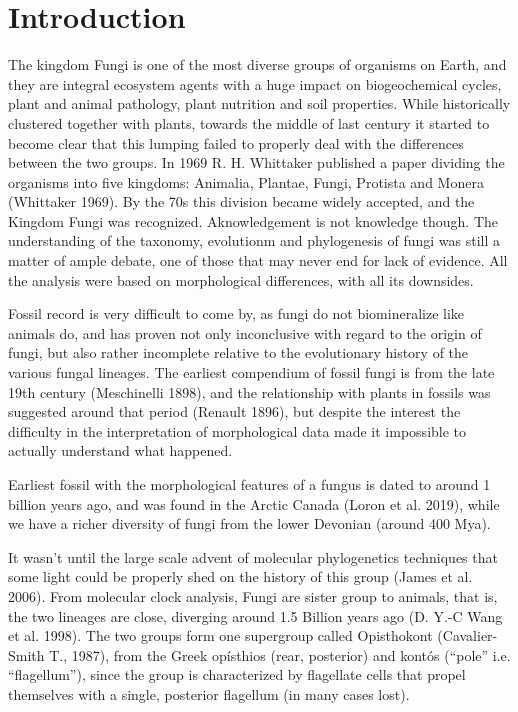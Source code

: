

\part{Introduction}
\label{introduction}

The kingdom Fungi is one of the most diverse groups of organisms on Earth, and they are integral ecosystem agents with a huge impact on biogeochemical cycles, plant and animal pathology, plant nutrition and soil properties.
While historically clustered together with plants, towards the middle of last century it started to become clear that this lumping failed to properly deal with the differences between the two groups. In 1969 R. H. Whittaker published a paper dividing the organisms into five kingdoms: Animalia, Plantae, Fungi, Protista and Monera (Whittaker 1969). By the 70s this division became widely accepted, and the Kingdom Fungi was recognized.
Aknowledgement is not knowledge though. The understanding of the taxonomy, evolutionm and phylogenesis of fungi was still a matter of ample debate, one of those that may never end for lack of evidence. All the analysis were based on morphological differences, with all its downsides.

Fossil record is very difficult to come by, as fungi do not biomineralize like animals do, and has proven not only inconclusive with regard to the origin of fungi, but also rather incomplete relative to the evolutionary history of the various fungal lineages. The earliest compendium of fossil fungi is from the late 19th century (Meschinelli 1898), and the relationship with plants in fossils was suggested around that period (Renault 1896), but despite the interest the difficulty in the interpretation of morphological data made it impossible to actually understand what happened.

Earliest fossil with the morphological features of a fungus is dated to around 1 billion years ago, and was found in the Arctic Canada (Loron et al. 2019), while we have a richer diversity of fungi from the lower Devonian (around 400 Mya).

It wasn't until the large scale advent of molecular phylogenetics techniques that some light could be properly shed on the history of this group (James et al. 2006).
From molecular clock analysis, Fungi are sister group to animals, that is, the two lineages are close, diverging around 1.5 Billion years ago (D. Y.-C Wang et al. 1998). The two groups form one supergroup called Opisthokont (Cavalier-Smith T., 1987), from the Greek opísthios (rear, posterior) and kontós (``pole'' i.e. ``flagellum''), since the group is characterized by flagellate cells that propel themselves with a single, posterior flagellum (in many cases lost).

